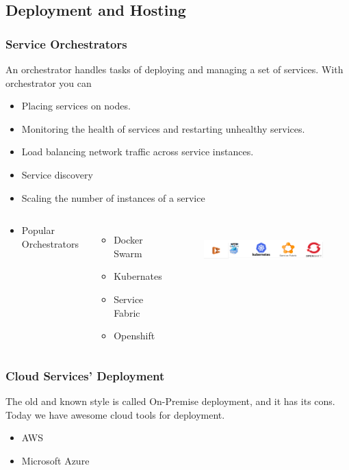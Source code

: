 \documentclass{beamer}
\begin{document}
	\subsection {Deployment and Hosting}
		\begin{frame}
			\frametitle{Service Orchestrators}
				An orchestrator handles tasks of deploying and managing a set of services. With orchestrator you can 
				\begin{itemize}
					\item<1-> Placing services on nodes. 
					\item<2-> Monitoring the health of services and restarting unhealthy services.
					\item<3-> Load balancing network traffic across service instances. 
					\item<4-> Service discovery
					\item<5-> Scaling the number of instances of a service
					\item<6->
						\vspace{5mm}
						\begin{columns}[c]
							Popular Orchestrators
							\begin{itemize}
								\item Docker Swarm
								\item Kubernates
								\item Service Fabric
								\item Openshift
							\end{itemize}
							
							\begin{figure}[h]
								\includegraphics[width=70mm, height=20mm, scale=1]{img/service-orch.png}
							\end{figure}\vspace{1mm}
						\end{columns}
				\end{itemize}
			\vspace{100mm}
		\end{frame}
	
		\begin{frame}
			\frametitle{Cloud Services' Deployment}
				The old and known style is called On-Premise deployment, and it has its cons.\\
				Today we have awesome cloud tools for deployment.
				\begin{itemize}
					\item AWS
					\item Microsoft Azure
				\end{itemize}
				\vspace{100mm}
		\end{frame}
\end{document}
